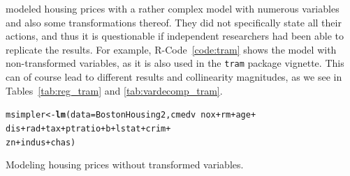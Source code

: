 \documentclass[11pt,a4paper,twoside]{book}\usepackage[]{graphicx}\usepackage[]{xcolor}
\makeatletter
\newcommand{\hlopt}[1]{\textcolor[rgb]{0,0,0}{#1}}%
\newcommand{\hlstd}[1]{\textcolor[rgb]{0.345,0.345,0.345}{#1}}%
\newcommand{\hlkwb}[1]{\textcolor[rgb]{0.69,0.353,0.396}{#1}}%
\newcommand{\hlkwc}[1]{\textcolor[rgb]{0.333,0.667,0.333}{#1}}%
\newcommand{\hlkwd}[1]{\textcolor[rgb]{0.737,0.353,0.396}{\textbf{#1}}}%
\newenvironment{kframe}{%
 \def\at@end@of@kframe{}%
 \ifinner\ifhmode%
  \def\at@end@of@kframe{\end{minipage}}%
  \begin{minipage}{\columnwidth}%
 \fi\fi%
 \def\FrameCommand##1{\hskip\@totalleftmargin \hskip-\fboxsep
 \colorbox{shadecolor}{##1}\hskip-\fboxsep
     \hskip-\linewidth \hskip-\@totalleftmargin \hskip\columnwidth}%
 \MakeFramed {\advance\hsize-\width
   \@totalleftmargin\z@ \linewidth\hsize
   \@setminipage}}%
 {\par\unskip\endMakeFramed%
 \at@end@of@kframe}
\newenvironment{knitrout}{}{} %
\makeatother
\begin{document}
\cite{Harrison1978} modeled housing prices with a rather complex model with numerous variables and also some transformations thereof. They did not specifically state all their actions, and thus it is questionable if independent researchers had been able to replicate the results. For example, \textsf{R}-Code~\ref{code:tram} shows the model with non-transformed variables, as it is also used in the \texttt{tram} package vignette. This can of course lead to different results and collinearity magnitudes, as we see in Tables~\ref{tab:reg_tram} and \ref{tab:vardecomp_tram}.
\begin{program}[h]
\begin{knitrout}
\color{fgcolor}\begin{kframe}
\begin{alltt}
\hlstd{msimpler} \hlkwb{<-} \hlkwd{lm}\hlstd{(}\hlkwc{data} \hlstd{= BostonHousing2, cmedv} \hlopt{~} \hlstd{nox} \hlopt{+}  \hlstd{rm} \hlopt{+} \hlstd{age} \hlopt{+}
               \hlstd{dis} \hlopt{+} \hlstd{rad} \hlopt{+} \hlstd{tax} \hlopt{+} \hlstd{ptratio} \hlopt{+} \hlstd{b} \hlopt{+} \hlstd{lstat} \hlopt{+} \hlstd{crim} \hlopt{+}
               \hlstd{zn} \hlopt{+} \hlstd{indus} \hlopt{+} \hlstd{chas )}
\end{alltt}
\end{kframe}
\end{knitrout}
\caption{Modeling housing prices without transformed variables.}\label{code:tram}
\end{program}
\end{document}
